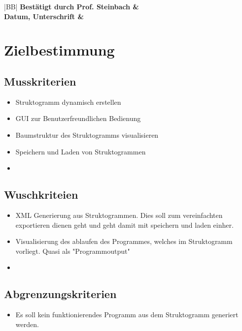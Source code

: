 \documentclass[a4paper,10pt]{report}
\begin{document}
\begin{titlepage}
\vspace{10mm}

\begin{center}
\begin{tabular}{|BB|}
\hline
\bfseries \large Best\"{a}tigt durch Prof. Steinbach & \quad \quad \quad \quad \quad \quad \quad \quad \quad \\
\bfseries \large Datum, Unterschrift &
\\
\hline
\end{tabular}
\end{center}

\end{titlepage}

\newpage
\tableofcontents 
\newpage
\section{Zielbestimmung}
\subsection{Musskriterien}
\begin{itemize}
\item Struktogramm dynamisch erstellen
\item GUI zur Benutzerfreundlichen Bedienung
\item Baumstruktur des Struktogramms visualisieren
\item Speichern und Laden von Struktogrammen
\item 
\end{itemize}
\subsection{Wuschkriteien}
\begin{itemize}
\item XML Generierung aus Struktogrammen. Dies soll zum vereinfachten exportieren dienen geht und geht damit mit speichern und laden einher.
\item Visualisierung des ablaufen des Programmes, welches im Struktogramm vorliegt. Quasi als "Programmoutput"
\item 
\end{itemize}
\subsection{Abgrenzungskriterien}
\begin{itemize}
\item Es soll kein funktionierendes Programm aus dem Struktogramm generiert werden.
\end{itemize}
\end{document}
